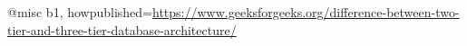 @misc
{b1,
  howpublished={\url{https://www.geeksforgeeks.org/difference-between-two-tier-and-three-tier-database-architecture/}}
}
